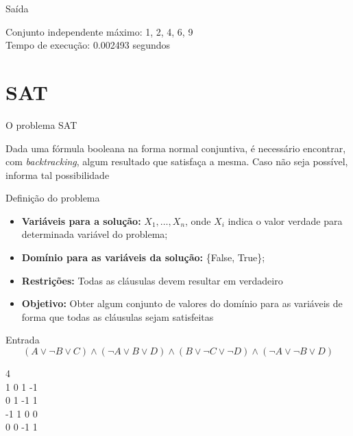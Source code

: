 \documentclass[compress,aspectratio=169]{beamer}
\begin{document}
    \begin{frame}{Saída}
        \begin{tcolorbox}[title=Saída da instância, width=\linewidth, 
          fontupper=\ttfamily, 
          halign=flush left]
            Conjunto independente máximo: {1, 2, 4, 6, 9}\\
            Tempo de execução: 0.002493 segundos\\
        \end{tcolorbox}
    \end{frame}

\section{SAT}
    \begin{frame}{O problema SAT}
        \begin{justify}
            Dada uma fórmula booleana na forma normal conjuntiva, é necessário encontrar, com \textit{backtracking}, algum resultado que satisfaça a mesma. 
            Caso não seja possível, informa tal possibilidade
        \end{justify}
    \end{frame}
    \begin{frame}{Definição do problema}
        \begin{itemize}
            \item \textbf{Variáveis para a solução:} \(X_1, \dots, X_n\), onde \(X_i\) indica o valor verdade para determinada variável do problema;
            \item \textbf{Domínio para as variáveis da solução:} \{False, True\};
            \item \textbf{Restrições:} Todas as cláusulas devem resultar em verdadeiro
            \item \textbf{Objetivo:} Obter algum conjunto de valores do domínio para as variáveis de forma que todas as cláusulas sejam satisfeitas
        \end{itemize}
    \end{frame}
    \begin{frame}{Entrada}
        \[(A \lor \neg B \lor C) \land (\neg A \lor B \lor D) \land (B \lor \neg C \lor \neg D) \land (\neg A \lor \neg B \lor D)\]
        \begin{tcolorbox}[title=Arquivo de entrada para a fórmula, width=\linewidth, fontupper=\ttfamily, halign=flush left]
            4 \\
            1 0 1 -1 \\
            0 1 -1 1 \\
            -1 1 0 0 \\
            0 0 -1 1
        \end{tcolorbox}
    \end{frame}
\end{document}
